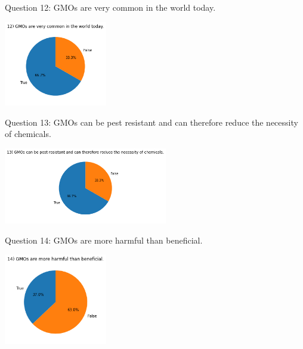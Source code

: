 \documentclass[11pt]{article}
\begin{document}
    \item{Question 12: GMOs are very common in the world today.}
    \begin{center}
        \includegraphics[width=170]{ChanR EDA/q12}
    \end{center}

    \item{Question 13: GMOs can be pest resistant and can therefore reduce the necessity of chemicals.}
    \begin{center}
        \includegraphics[width=270]{ChanR EDA/q13}
    \end{center}

    \newpage
    \item{Question 14: GMOs are more harmful than beneficial.}
    \begin{center}
        \includegraphics[width=170]{ChanR EDA/q14}
    \end{center}
\end{document}
